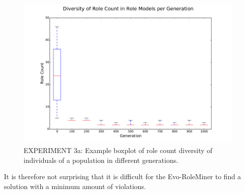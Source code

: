 \begin{figure}[H]
	\centering
	\includegraphics[scale=0.3]{./Figures/exp3a_diversity}
	\caption{EXPERIMENT 3a: Example boxplot of role count diversity of individuals of a population in different generations.}
	\label{fig:exp3a_diversity}
\end{figure}

It is therefore not surprising that it is difficult for the Evo-RoleMiner to find a solution with a minimum amount of violations.